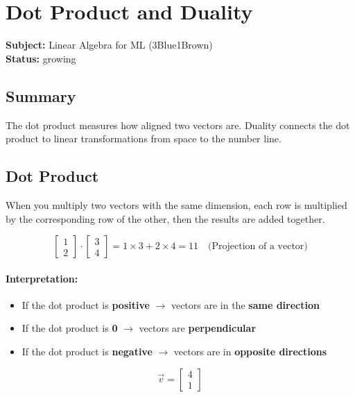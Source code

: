 \section{Dot Product and Duality}
\label{sec:dot-product}

\noindent\textbf{Subject:} Linear Algebra for ML (3Blue1Brown) \\
\textbf{Status:} growing

\subsection*{Summary}
The dot product measures how aligned two vectors are. Duality connects the dot product to linear transformations from space to the number line.

\subsection{Dot Product}

\begin{defbox}
When you multiply two vectors with the same dimension, each row is multiplied by the corresponding row of the other, then the results are added together.
\end{defbox}

\[
\begin{bmatrix} 1 \\ 2 \end{bmatrix} \cdot \begin{bmatrix} 3 \\ 4 \end{bmatrix}
= 1 \times 3 + 2 \times 4 = 11
\quad \text{(Projection of a vector)}
\]

\paragraph{Interpretation:}
\begin{itemize}[nosep]
  \item If the dot product is \textbf{positive} $\rightarrow$ vectors are in the \textbf{same direction}
  \item If the dot product is \textbf{0} $\rightarrow$ vectors are \textbf{perpendicular}
  \item If the dot product is \textbf{negative} $\rightarrow$ vectors are in \textbf{opposite directions}
\end{itemize}

\[
\vec{v} = \begin{bmatrix} 4 \\ 1 \end{bmatrix}
\]

